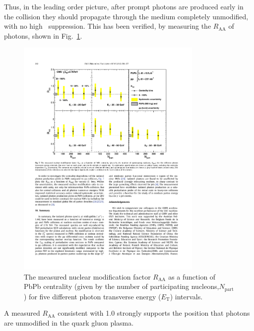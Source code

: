Thus, in the leading order picture, after prompt photons are produced early in the collision they should propagate through the medium completely unmodified, with no high \pt~suppression. This has been verified, by measuring the $R_\mathrm{AA}$ of photons, shown in Fig.~\ref{fig:photon_raa}.

\begin{figure}[htpb]
  \centering
  \includegraphics[width=0.8\textwidth]{Introduction/photon_raa}
  \caption{The measured nuclear modification factor $R_\mathrm{AA}$ as a function of PbPb centrality (given by the number of participating nucleons,$N_\mathrm{part}$) for five different photon transverse energy ($E_\mathrm{T}$) intervals.}
  \label{fig:photon_raa}
\end{figure}

A measured $R_\mathrm{AA}$ consistent with 1.0 strongly supports the position that photons are unmodified in the quark gluon plasma.



